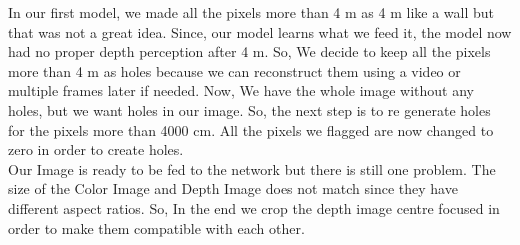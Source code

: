 In our first model, we made all the pixels more than 4 m as 4 m like a wall but that was not a great idea. Since, our model learns what we feed it, the model now had no proper depth perception after 4 m. So, We decide to keep all the pixels more than 4 m as holes because we can reconstruct them using a video or multiple frames later if needed. Now, We have the whole image without any holes, but we want holes in our image. So, the next step is to re generate holes for the pixels more than 4000 cm. All the pixels we flagged are now changed to zero in order to create holes. \\

Our Image is ready to be fed to the network but there is still one problem. The size of the Color Image and Depth Image does not match since they have different aspect ratios. So, In the end we crop the depth image centre focused in order to make them compatible with each other.\\





\newpage